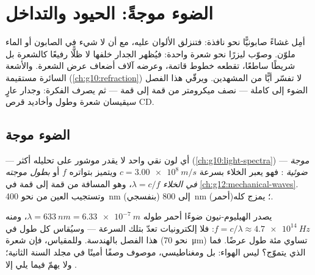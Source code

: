 \chapter{الضوء موجةً: الحيود والتداخل}\label{ch:g12:light-as-wave}

أمِل غشاءً صابونيًّا نحو نافذة: فتنزلق الألوان عليه، مع أن
لا شيء في الصابون أو الماء ملوّن. وصوّب ليزرًا نحو شعرة واحدة:
فيُظهر الجدار خلفها لا ظلًّا رفيعًا كالشعرة بل شريطًا ساطعًا،
تقطعه خطوط قاتمة، وعرضه آلاف أضعاف عرض الشعرة.
والأشعة السائرة مستقيمة (\cref{ch:g10:refraction}) لا تفسّر أيًّا من
المشهدين. ويرقّي هذا الفصل الضوء إلى  كاملة --- نصف
ميكرومتر من قمة إلى قمة --- ثم يصرف الفكرة: 
وجدار عارٍ سيقيسان شعرة وطول  وأخاديد قرص CD.

\section{الضوء موجة}

\begin{definition}\label{def:g12:light-as-wave:lightwave}
 --- أي لون نقي واحد لا يقدر موشور على تحليله
أكثر (\cref{ch:g10:light-spectra}) --- \emph{موجة
ضوئية} : فهو يعبر الخلاء بسرعة $c = \qty{3.00e8}{m/s}$
ويتميز بتواتره $f$ أو \emph{بطول موجته في
الخلاء} $\lambda = c/f$، وهو المسافة من
قمة إلى قمة في \cref{ch:g12:mechanical-waves}. وتستجيب العين من نحو
\qty{400}{nm} (بنفسجي) إلى \qty{800}{nm} (أحمر)؛
 يمزج  كله.
\end{definition}

\begin{example}\label{ex:g12:light-as-wave:orders}
يصدر  الهيليوم-نيون ضوءًا أحمر طوله $\lambda = \qty{633}{nm} =
\qty{6.33e-7}{m}$، ومنه $f = c/\lambda \approx \qty{4.7e14}{Hz}$: فلا
إلكترونيات تعدّ بتلك السرعة --- وسيُقاس كل طول  في هذا الفصل
بالهندسة. وللمقياس، فإن شعرة (نحو \qty{70}{\micro m})
تساوي مئة طول  عرضًا. فما الذي يتموّج؟ ليس الهواء: بل 
ومغناطيسي، موصوف وصفًا أمينًا في مجلد السنة الثانية؛ ولا يهمّ فيما يلي إلا
.
\end{example}

